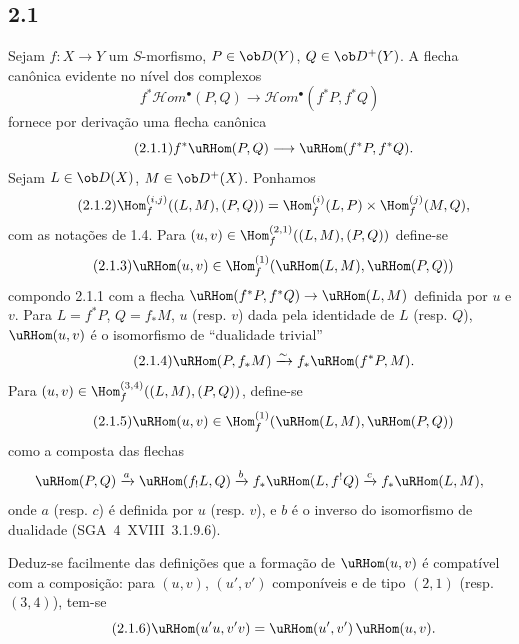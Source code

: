 \subsection*{2.1}
Sejam $f:X\to Y$ um $S$-morfismo, $P\in\ob D(Y)$, $Q\in\ob D^{+}(Y)$. A flecha canônica evidente no nível dos complexos
\[
f^{*}\mathcal Hom^{\bullet}(P,Q)\longrightarrow\mathcal Hom^{\bullet}(f^{*}P,f^{*}Q)
\]
fornece por derivação uma flecha canônica
\begin{equation}\tag{2.1.1}
f^{*}\uRHom(P,Q)\longrightarrow\uRHom(f^{*}P,f^{*}Q).
\end{equation}
Sejam $L\in\ob D(X)$, $M\in\ob D^{+}(X)$. Ponhamos
\begin{equation}\tag{2.1.2}
\Hom_f^{(i,j)}((L,M),(P,Q))=\Hom_f^{(i)}(L,P)\times\Hom_f^{(j)}(M,Q),
\end{equation}
com as notações de 1.4. Para $(u,v)\in\Hom_f^{(2,1)}((L,M),(P,Q))$ define-se
\begin{equation}\tag{2.1.3}
\uRHom(u,v)\in\Hom_f^{(1)}(\uRHom(L,M),\uRHom(P,Q))
\end{equation}
compondo 2.1.1 com a flecha $\uRHom(f^{*}P,f^{*}Q)\to\uRHom(L,M)$ definida por $u$ e $v$. Para $L=f^{*}P$, $Q=f_{*}M$, $u$ (resp. $v$) dada pela identidade de $L$ (resp. $Q$), $\uRHom(u,v)$ é o isomorfismo de ``dualidade trivial''
\begin{equation}\tag{2.1.4}
\uRHom(P,f_{*}M)\xrightarrow{\sim}f_{*}\uRHom(f^{*}P,M).
\end{equation}
Para $(u,v)\in\Hom_f^{(3,4)}((L,M),(P,Q))$, define-se
\begin{equation}\tag{2.1.5}
\uRHom(u,v)\in\Hom_f^{(1)}(\uRHom(L,M),\uRHom(P,Q))
\end{equation}
como a composta das flechas
\[
\uRHom(P,Q)\xrightarrow{a}\uRHom(f_{!}L,Q)\xrightarrow{b}f_{*}\uRHom(L,f^{!}Q)\xrightarrow{c}f_{*}\uRHom(L,M),
\]
onde $a$ (resp. $c$) é definida por $u$ (resp. $v$), e $b$ é o inverso do isomorfismo de dualidade (SGA~4~XVIII~3.1.9.6).

Deduz-se facilmente das definições que a formação de $\uRHom(u,v)$ é compatível com a composição: para $(u,v)$, $(u',v')$ componíveis e de tipo $(2,1)$ (resp. $(3,4)$), tem-se
\begin{equation}\tag{2.1.6}
\uRHom(u'u,v'v)=\uRHom(u',v')\,\uRHom(u,v).
\end{equation}

